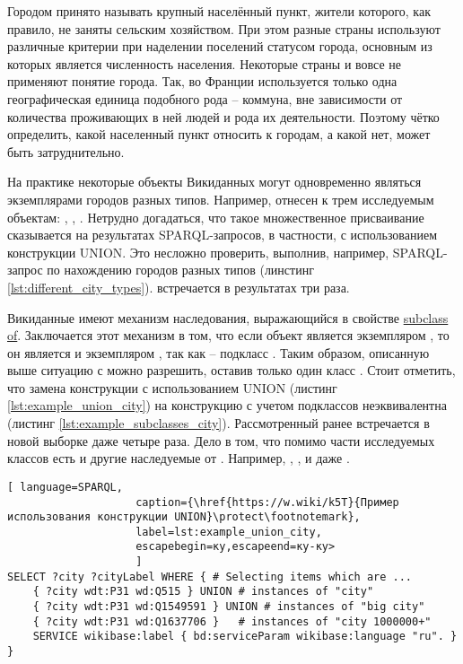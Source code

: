 Городом принято называть крупный населённый пункт, жители которого, как правило, не заняты сельским хозяйством. При этом разные страны используют различные критерии при наделении поселений статусом города, основным из которых является численность населения. Некоторые страны и вовсе не применяют понятие города. Так, во Франции используется только одна географическая единица подобного рода -- коммуна, вне зависимости от количества проживающих в ней людей и рода их деятельности. Поэтому чётко определить, какой населенный пункт относить к городам, а какой нет, может быть затруднительно.

На практике некоторые объекты Викиданных могут одновременно являться экземплярами городов разных типов. Например,  отнесен к трем исследуемым объектам: , , . Нетрудно догадаться, что такое множественное присваивание сказывается на результатах SPARQL-запросов, в частности, с использованием конструкции UNION. Это несложно проверить, выполнив, например, SPARQL-запрос по нахождению городов разных типов (линстинг \ref{lst:different_city_types}).  встречается в результатах три раза. 

Викиданные имеют механизм наследования, выражающийся в свойстве \href{https://www.wikidata.org/wiki/Property:P279}{subclass of}. Заключается этот механизм в том, что если объект является экземпляром , то он является и экземпляром  , так как  -- подкласс  . Таким образом, описанную выше ситуацию с  можно разрешить, оставив только один класс . Стоит отметить, что замена конструкции с использованием UNION (листинг \ref{lst:example_union_city}) на конструкцию с учетом подклассов неэквивалентна (листинг \ref{lst:example_subclasses_city}). Рассмотренный ранее  встречается в новой выборке даже четыре раза. Дело в том, что помимо части исследуемых классов есть и другие наследуемые от . Например, , ,  и даже .

\begin{lstlisting}[ language=SPARQL, 
                    caption={\href{https://w.wiki/k5T}{Пример использования конструкции UNION}\protect\footnotemark},
                    label=lst:example_union_city, 
                    escapebegin=ку,escapeend=ку-ку>
                    ]
SELECT ?city ?cityLabel WHERE { # Selecting items which are ...
	{ ?city wdt:P31 wd:Q515 } UNION # instances of "city"            
	{ ?city wdt:P31 wd:Q1549591 } UNION # instances of "big city"               
	{ ?city wdt:P31 wd:Q1637706 } 	# instances of "city 1000000+"
	SERVICE wikibase:label { bd:serviceParam wikibase:language "ru". }
}
\end{lstlisting}


